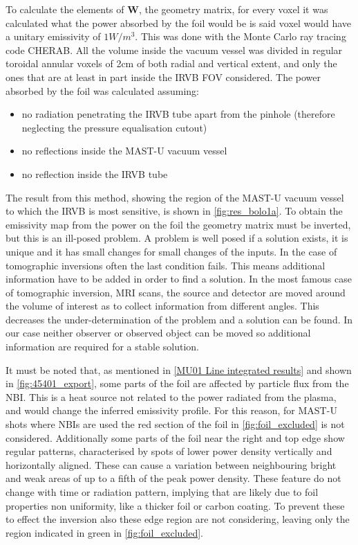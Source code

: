 To calculate the elements of $\bm{W}$, the geometry matrix, for every voxel it was calculated what the power absorbed by the foil would be is said voxel would have a unitary emissivity of $1W/m^3$. This was done with the Monte Carlo ray tracing code CHERAB. All the volume inside the vacuum vessel was divided in regular toroidal annular voxels of 2cm of both radial and vertical extent, and only the ones that are at least in part inside the IRVB FOV considered. The power absorbed by the foil was calculated assuming:
\begin{itemize}
    \item no radiation penetrating the IRVB tube apart from the pinhole (therefore neglecting the pressure equalisation cutout)
    \item no reflections inside the MAST-U vacuum vessel
    \item no reflection inside the IRVB tube
\end{itemize}
The result from this method, showing the region of the MAST-U vacuum vessel to which the IRVB is most sensitive, is shown in \autoref{fig:res_bolo1a}.
To obtain the emissivity map from the power on the foil the geometry matrix must be inverted, but this is an ill-posed problem. A problem is well posed if a solution exists, it is unique and it has small changes for small changes of the inputs. \cite{Hansen1998} In the case of tomographic inversions often the last condition fails. \cite{Hansen2010} This means additional information have to be added in order to find a solution. In the most famous case of tomographic inversion, MRI scans, the source and detector are moved around the volume of interest as to collect information from different angles. This decreases the under-determination of the problem and a solution can be found. In our case neither observer or observed object can be moved so additional information are required for a stable solution.

It must be noted that, as mentioned in \autoref{MU01 Line integrated results} and shown in \autoref{fig:45401_export}, some parts of the foil are affected by particle flux from the NBI. This is a heat source not related to the power radiated from the plasma, and would change the inferred emissivity profile. For this reason, for MAST-U shots where NBIs are used the red section of the foil in \autoref{fig:foil_excluded} is not considered. Additionally some parts of the foil near the right and top edge show regular patterns, characterised by spots of lower power density vertically and horizontally aligned. These can cause a variation between neighbouring bright and weak areas of up to a fifth of the peak power density. These feature do not change with time or radiation pattern, implying that are likely due to foil properties non uniformity, like a thicker foil or carbon coating. To prevent these to effect the inversion also these edge region are not considering, leaving only the region indicated in green in \autoref{fig:foil_excluded}.

